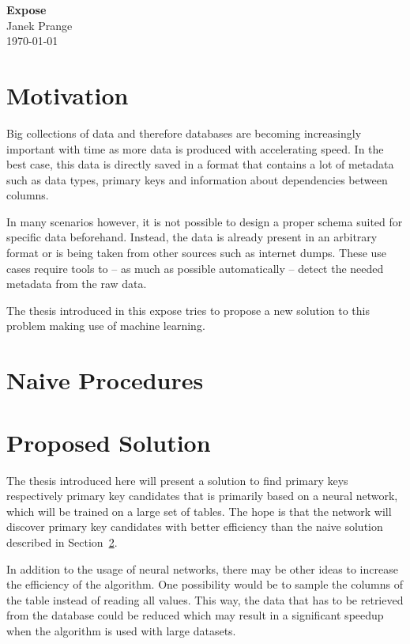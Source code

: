 \documentclass[a4paper]{article}
\begin{document}
\thispagestyle{firstpagestyle}
\begin{center}
  \huge \textbf{Expose}\\[8pt]
  \normalsize Janek Prange\\
  \today
\end{center}

\section{Motivation}
Big collections of data and therefore databases are becoming increasingly important with time as more data is produced with accelerating speed. In the best case, this data is directly saved in a format that contains a lot of metadata such as data types, primary keys and information about dependencies between columns.

In many scenarios however, it is not possible to design a proper schema suited for specific data beforehand. Instead, the data is already present in an arbitrary format or is being taken from other sources such as internet dumps. These use cases require tools to -- as much as possible automatically -- detect the needed metadata from the raw data. %

The thesis introduced in this expose tries to propose a new solution to this problem making use of machine learning.


\section{Naive Procedures}\label{sec:naiveProcedures}


\section{Proposed Solution}\label{sec:proposedSolution}
The thesis introduced here will present a solution to find primary keys respectively primary key candidates that is primarily based on a neural network, which will be trained on a large set of tables. The hope is that the network will discover primary key candidates with better efficiency than the naive solution described in Section~\ref{sec:naiveProcedures}.

In addition to the usage of neural networks, there may be other ideas to increase the efficiency of the algorithm. One possibility would be to sample the columns of the table instead of reading all values. This way, the data that has to be retrieved from the database could be reduced which may result in a significant speedup when the algorithm is used with large datasets.
\end{document}
